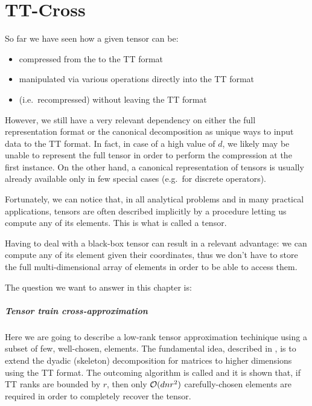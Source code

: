 \chapter{TT-Cross}
So far we have seen how a given tensor can be:
\begin{itemize}
\item compressed from the  to the TT format
\item manipulated via various operations directly into the TT format
\item {} (i.e.\ recompressed) without leaving the TT format
\end{itemize}

However, we still have a very relevant dependency on either the full representation format or the canonical decomposition as unique ways to input data to the TT format.
In fact, in case of a high value of $d$, we likely may be unable to represent the full tensor in order to perform the compression at the first instance. On the other hand, a canonical representation of tensors is usually already available only in few special cases (e.g.\ for discrete operators).

Fortunately, we can notice that, in all analytical problems and in many practical applications, tensors are often described implicitly by a procedure letting us compute any of its elements.
This is what is called a  tensor.

Having to deal with a black-box tensor can result in a relevant advantage: we can compute any of its element given their coordinates, thus we don't have to store the full multi-dimensional array of elements in order to be able to access them.

The question we want to answer in this chapter is: 

\paragraph{Tensor train cross-approximation}
Here we are going to describe a low-rank tensor approximation techinique using a subset of few, well-chosen, elements.
The fundamental idea, described in \cite{tt-cross}, is to extend the dyadic (skeleton) decomposition for matrices to higher dimensions using the TT format.
The outcoming algorithm is called  and it is shown  that, if TT ranks are bounded by $r$, then only $\mathcal{O}(dnr^2)$ carefully-chosen elements are required in order to completely recover the tensor.

